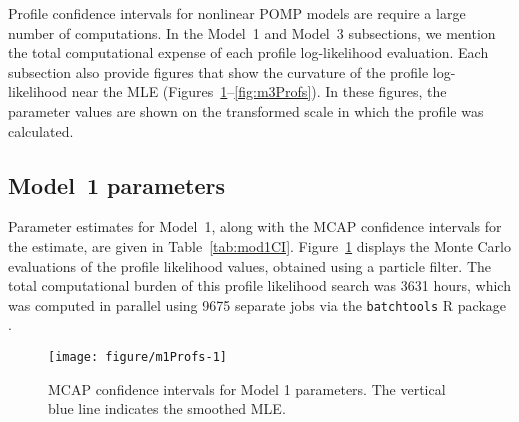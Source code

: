 Profile confidence intervals for nonlinear POMP models are require a large number of computations. In the Model~1 and Model~3 subsections, we mention the total computational expense of each profile log-likelihood evaluation. Each subsection also provide figures that show the curvature of the profile log-likelihood near the MLE (Figures~\ref{fig:m1Profs}--\ref{fig:m3Profs}).
In these figures, the parameter values are shown on the transformed scale in which the profile was calculated.

\subsection{Model~1 parameters}

Parameter estimates for Model~1, along with the MCAP confidence intervals for the estimate, are given in Table~\ref{tab:mod1CI}.
Figure~\ref{fig:m1Profs} displays the Monte Carlo evaluations of the profile likelihood values, obtained using a particle filter.
The total computational burden of this profile likelihood search was 3631 hours, which was computed in parallel using 9675 separate jobs via the \texttt{batchtools} R package \cite{batchtools}.





\begin{figure}[ht]
\begin{knitrout}
\color{fgcolor}

{\centering \texttt{[image: figure/m1Profs-1]} 

}


\end{knitrout}
\caption[MCAP confidence intervals for Model 1 parameters.]{\label{fig:m1Profs}MCAP confidence intervals for Model 1 parameters. The vertical blue line indicates the smoothed MLE.}
\end{figure}

